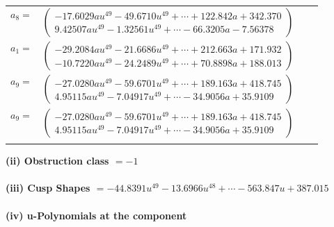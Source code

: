 \documentclass[1p]{elsarticle_modified}
\theoremstyle{definition}
\begin{document}
\begin{tabular}{m{7pt} m{180pt} m{7pt} m{180pt} }
\flushright $a_{8}=$&$\begin{pmatrix}-17.6029 a u^{49}-49.6710 u^{49}+\cdots+122.842 a+342.370\\9.42507 a u^{49}-1.32561 u^{49}+\cdots-66.3205 a-7.56378\end{pmatrix}$ \\
\flushright $a_{1}=$&$\begin{pmatrix}-29.2084 a u^{49}-21.6686 u^{49}+\cdots+212.663 a+171.932\\-10.7220 a u^{49}-24.2489 u^{49}+\cdots+70.8898 a+188.013\end{pmatrix}$ \\
\flushright $a_{9}=$&$\begin{pmatrix}-27.0280 a u^{49}-59.6701 u^{49}+\cdots+189.163 a+418.745\\4.95115 a u^{49}-7.04917 u^{49}+\cdots-34.9056 a+35.9109\end{pmatrix}$\\ \flushright $a_{9}=$&$\begin{pmatrix}-27.0280 a u^{49}-59.6701 u^{49}+\cdots+189.163 a+418.745\\4.95115 a u^{49}-7.04917 u^{49}+\cdots-34.9056 a+35.9109\end{pmatrix}$\\&\end{tabular}
\flushleft \textbf{(ii) Obstruction class $= -1$}\\~\\
\flushleft \textbf{(iii) Cusp Shapes $= -44.8391 u^{49}-13.6966 u^{48}+\cdots-563.847 u+387.015$}\\~\\
\newpage\renewcommand{\arraystretch}{1}
\flushleft \textbf{(iv) u-Polynomials at the component}\newline \\
\end{document}
